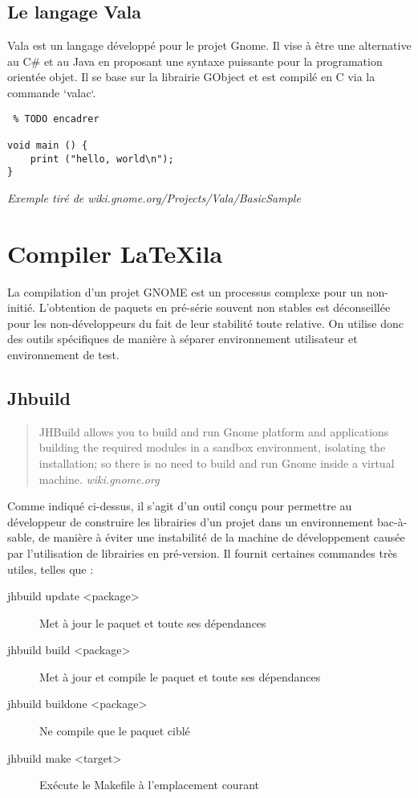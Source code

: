 \documentclass[a4paper,11pt]{report}
\begin{document}
\subsection{Le langage Vala}
\label{sub:vala}
Vala est un langage développé pour le projet Gnome. Il vise à être une alternative au C\# et au Java en proposant une syntaxe puissante pour la programation orientée objet.
Il se base sur la librairie GObject et est compilé en C via la commande `valac`.
\begin{lstlisting} % TODO encadrer

void main () {
    print ("hello, world\n");
}

\end{lstlisting}\textit{Exemple tiré de wiki.gnome.org/Projects/Vala/BasicSample}

\section{Compiler LaTeXila}
\label{cha:compiler}
La compilation d'un projet GNOME est un processus complexe pour un non-initié. L'obtention de paquets en pré-série souvent non stables est déconseillée pour les non-développeurs du fait de leur stabilité toute relative. On utilise donc des outils spécifiques de manière à séparer environnement utilisateur et environnement de test. 

\subsection{Jhbuild}
\label{sub:jhbuild}

\begin{quote}
  JHBuild allows you to build and run Gnome platform and applications building the required modules in a sandbox environment, isolating the installation; so there is no need to build and run Gnome inside a virtual machine. \textit{wiki.gnome.org}
\end{quote}

Comme indiqué ci-dessus, il s'agit d'un outil conçu pour permettre au développeur de construire les librairies d'un projet dans un environnement bac-à-sable, de manière à éviter une instabilité de la machine de développement causée par l'utilisation de librairies en pré-version. Il fournit certaines commandes très utiles, telles que :

\begin{description}
  \item[jhbuild update <package>] Met à jour le paquet et toute ses dépendances
  \item[jhbuild build <package>] Met à jour et compile le paquet et toute ses dépendances
  \item[jhbuild buildone <package>] Ne compile que le paquet ciblé
  \item[jhbuild make <target>] Exécute le Makefile à l'emplacement courant
\end{description}
\end{document}
